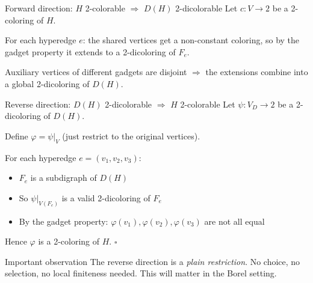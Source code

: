 \documentclass[aspectratio=169, 12pt]{beamer}
\begin{document}
\begin{frame}{Forward direction: $H$ 2-colorable $\Rightarrow$ $D(H)$ 2-dicolorable}
Let $c\colon V \to 2$ be a 2-coloring of $H$.

\medskip

For each hyperedge $e$: the shared vertices get a non-constant coloring, so by the gadget property it \alert{extends} to a 2-dicoloring of $F_e$.

\medskip

Auxiliary vertices of different gadgets are disjoint $\Rightarrow$ the extensions combine into a global 2-dicoloring of $D(H)$.

\pause
\bigskip

\begin{center}
\end{center}
\end{frame}

\begin{frame}{Reverse direction: $D(H)$ 2-dicolorable $\Rightarrow$ $H$ 2-colorable}
Let $\psi\colon V_D \to 2$ be a 2-dicoloring of $D(H)$.

\medskip

Define $\varphi = \psi|_V$ (just \alert{restrict} to the original vertices).

\medskip

For each hyperedge $e = (v_1,v_2,v_3)$:
\begin{itemize}
	\item $F_e$ is a subdigraph of $D(H)$
	\item So $\psi|_{V(F_e)}$ is a valid 2-dicoloring of $F_e$
	\item By the gadget property: $\varphi(v_1), \varphi(v_2), \varphi(v_3)$ are \alert{not all equal}
\end{itemize}

\medskip

Hence $\varphi$ is a 2-coloring of $H$. \hfill$\square$

\pause
\bigskip

\begin{alertblock}{Important observation}
The reverse direction is a \emph{plain restriction}. No choice, no selection, no local finiteness needed. This will matter in the Borel setting.
\end{alertblock}
\end{frame}
\end{document}
